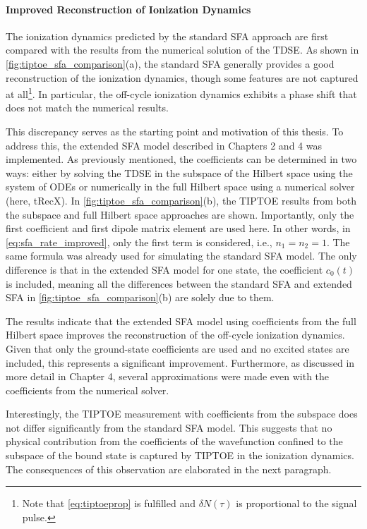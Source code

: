 \paragraph{Improved Reconstruction of Ionization Dynamics}
The ionization dynamics predicted by the standard SFA approach \cite{Theory_NPS} are first compared with the results from the numerical solution of the TDSE. As shown in \ref{fig:tiptoe_sfa_comparison}(a), the standard SFA generally provides a good reconstruction of the ionization dynamics, though some features are not captured at all\footnote{Note that \eqref{eq:tiptoeprop} is fulfilled and $\delta N(\tau)$ is proportional to the signal pulse.}. In particular, the off-cycle ionization dynamics exhibits a phase shift that does not match the numerical results.

\medskip
This discrepancy serves as the starting point and motivation of this thesis.
To address this, the extended SFA model described in Chapters 2 and 4 was implemented.
As previously mentioned, the coefficients can be determined in two ways: either by solving the TDSE in the subspace of the Hilbert space using the system of ODEs or numerically in the full Hilbert space using a numerical solver (here, tRecX). In \ref{fig:tiptoe_sfa_comparison}(b), the TIPTOE results from both the subspace and full Hilbert space approaches are shown.
Importantly, only the first coefficient and first dipole matrix element are used here. In other words, in \eqref{eq:sfa_rate_improved}, only the first term is considered, i.e., $n_1=n_2=1$.
The same formula was already used for simulating the standard SFA model.
The only difference is that in the extended SFA model for one state, the coefficient $c_0(t)$ is included, meaning all the differences between the standard SFA and extended SFA in \ref{fig:tiptoe_sfa_comparison}(b) are solely due to them.

\medskip
The results indicate that the extended SFA model using coefficients from the full Hilbert space improves the reconstruction of the off-cycle ionization dynamics. Given that only the ground-state coefficients are used and no excited states are included, this represents a significant improvement. Furthermore, as discussed in more detail in Chapter 4, several approximations were made even with the coefficients from the numerical solver.

\medskip
Interestingly, the TIPTOE measurement with coefficients from the subspace does not differ significantly from the standard SFA model.
This suggests that no physical contribution from the coefficients of the wavefunction confined to the subspace of the bound state is captured by TIPTOE in the ionization dynamics.
The consequences of this observation are elaborated in the next paragraph.

